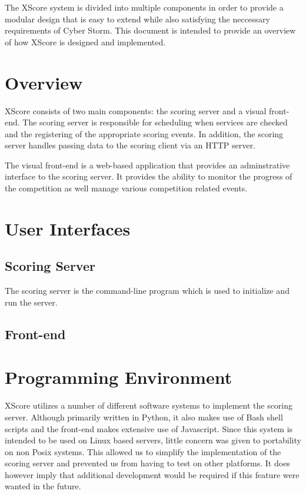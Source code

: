 \documentclass[letterpaper,10pt,english]{manual}
\begin{document}
The XScore system is divided into multiple components in order to provide a modular design
that is easy to extend while also satisfying the neccessary requirements of Cyber Storm.
This document is intended to provide an overview of how XScore is designed and implemented.


\section{Overview}

XScore consists of two main components: the scoring server and a visual front-end.
The scoring server is responsible for scheduling when services are checked and the
registering of the appropriate scoring events.  In addition, the scoring server handles
passing data to the scoring client via an HTTP server.

The visual front-end is a web-based application that provides an
adminstrative interface to the scoring server.  It provides the
ability to monitor the progress of the competition as well manage
various competition related events.


\section{User Interfaces}


\subsection{Scoring Server}

The scoring server is the command-line program  which is used to initialize
and run the server.


\subsection{Front-end}


\section{Programming Environment}

XScore utilizes a number of different software systems to implement the scoring server.
Although primarily written in Python, it also makes use of Bash shell scripts and the front-end
makes extensive use of Javascript.  Since this system is intended to be used on Linux based servers,
little concern was given to portability on non Posix systems.  This allowed us to simplify the
implementation of the scoring server and prevented us from having to test on other platforms.
It does however imply that additional development would be required if this feature were wanted in
the future.
\end{document}
